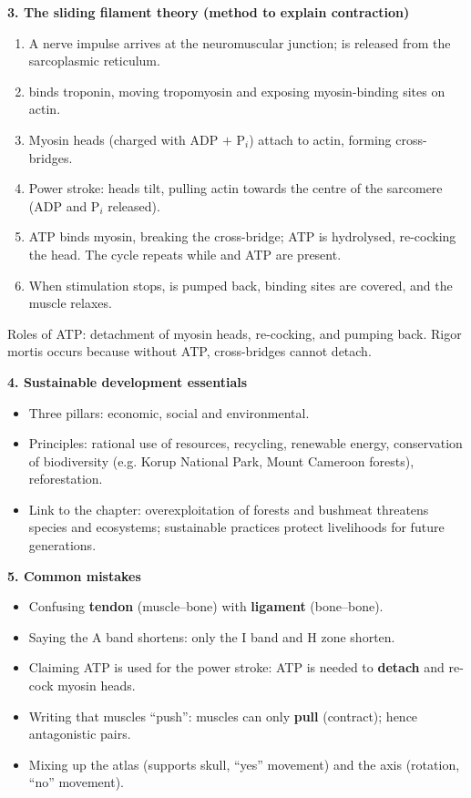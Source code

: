 \documentclass[11pt]{article}
\newcommand{\cle}[1]{{\popxbold\color{popdark}#1}}
\begin{document}
\begin{bilan}
\textbf{3. The sliding filament theory (method to explain contraction)}
\begin{enumerate}
\item A nerve impulse arrives at the neuromuscular junction;  is released from the sarcoplasmic reticulum.
\item {} binds troponin, moving tropomyosin and exposing myosin-binding sites on actin.
\item Myosin heads (charged with ADP $+$ P$_i$) attach to actin, forming \cle{cross-bridges}.
\item Power stroke: heads tilt, pulling actin towards the centre of the sarcomere (ADP and P$_i$ released).
\item ATP binds myosin, breaking the cross-bridge; ATP is hydrolysed, re-cocking the head. The cycle repeats while  and ATP are present.
\item When stimulation stops,  is pumped back, binding sites are covered, and the muscle relaxes.
\end{enumerate}
Roles of ATP: detachment of myosin heads, re-cocking, and pumping  back. Rigor mortis occurs because without ATP, cross-bridges cannot detach.

\textbf{4. Sustainable development essentials}
\begin{itemize}
\item Three pillars: \cle{economic}, \cle{social} and \cle{environmental}.
\item Principles: rational use of resources, recycling, renewable energy, conservation of biodiversity (e.g. Korup National Park, Mount Cameroon forests), reforestation.
\item Link to the chapter: overexploitation of forests and bushmeat threatens species and ecosystems; sustainable practices protect livelihoods for future generations.
\end{itemize}

\textbf{5. Common mistakes}
\begin{itemize}
\item Confusing \textbf{tendon} (muscle--bone) with \textbf{ligament} (bone--bone).
\item Saying the A band shortens: only the I band and H zone shorten.
\item Claiming ATP is used for the power stroke: ATP is needed to \textbf{detach} and re-cock myosin heads.
\item Writing that muscles ``push'': muscles can only \textbf{pull} (contract); hence antagonistic pairs.
\item Mixing up the atlas (supports skull, ``yes'' movement) and the axis (rotation, ``no'' movement).
\end{itemize}


\end{bilan}
\end{document}
